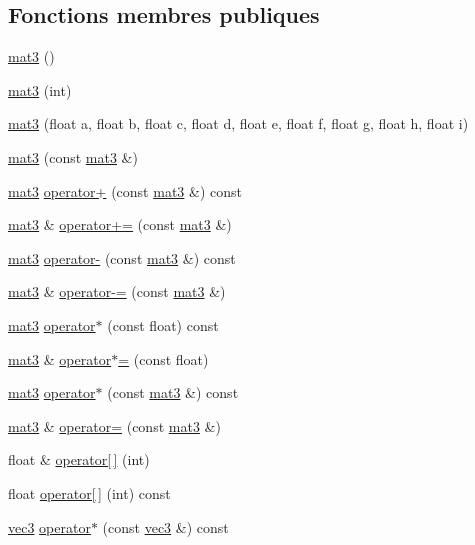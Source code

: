 \subsection*{Fonctions membres publiques}
\begin{DoxyCompactItemize}
\item 
\hyperlink{structmat3_a463027040addb1c56fe84c91b74b8d79}{mat3} ()
\item 
\hyperlink{structmat3_ae70cff0193ac1f77c61df7a2f4c00ef6}{mat3} (int)
\item 
\hyperlink{structmat3_ad5f393d1a6f7986207680e54e81f9906}{mat3} (float a, float b, float c, float d, float e, float f, float g, float h, float i)
\item 
\hyperlink{structmat3_aa761860db5b00723649f4751b34df952}{mat3} (const \hyperlink{structmat3}{mat3} \&)
\item 
\hyperlink{structmat3}{mat3} \hyperlink{structmat3_af00e96acb51cd53669a5d3a169d96e65}{operator+} (const \hyperlink{structmat3}{mat3} \&) const 
\item 
\hyperlink{structmat3}{mat3} \& \hyperlink{structmat3_a51c6ec6fd44fcd36022441064f6c285d}{operator+=} (const \hyperlink{structmat3}{mat3} \&)
\item 
\hyperlink{structmat3}{mat3} \hyperlink{structmat3_aa4a3e2abd71f23304e1069d3da0d60c0}{operator-\/} (const \hyperlink{structmat3}{mat3} \&) const 
\item 
\hyperlink{structmat3}{mat3} \& \hyperlink{structmat3_a1718976498fb7eddf36bbfebe76c0731}{operator-\/=} (const \hyperlink{structmat3}{mat3} \&)
\item 
\hyperlink{structmat3}{mat3} \hyperlink{structmat3_ab7b1c00fe3bfe66e48066f03a7c99cf5}{operator$\ast$} (const float) const 
\item 
\hyperlink{structmat3}{mat3} \& \hyperlink{structmat3_a782476876e4828df805c118734cef45f}{operator$\ast$=} (const float)
\item 
\hyperlink{structmat3}{mat3} \hyperlink{structmat3_affc4320ad21bf2276b32da8d96006a08}{operator$\ast$} (const \hyperlink{structmat3}{mat3} \&) const 
\item 
\hyperlink{structmat3}{mat3} \& \hyperlink{structmat3_aecf76e04b3d56cc333129fef2a832bb6}{operator=} (const \hyperlink{structmat3}{mat3} \&)
\item 
float \& \hyperlink{structmat3_afabeddfb3c711e2b0f806d9d8fa0534c}{operator\mbox{[}$\,$\mbox{]}} (int)
\item 
float \hyperlink{structmat3_ad61ce758d2b8def99daa43bded003023}{operator\mbox{[}$\,$\mbox{]}} (int) const 
\item 
\hyperlink{structvec3}{vec3} \hyperlink{structmat3_a08a5fd5fdb707a1ffe11b4e2c8b76beb}{operator$\ast$} (const \hyperlink{structvec3}{vec3} \&) const 
\end{DoxyCompactItemize}
